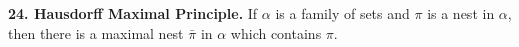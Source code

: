 \textbf{24. Hausdorff Maximal Principle.} If $\alpha$ is a family of sets and $\pi$ is a nest in $\alpha$, then there is a maximal nest $\bar{\pi}$ in $\alpha$ which contains $\pi$.
